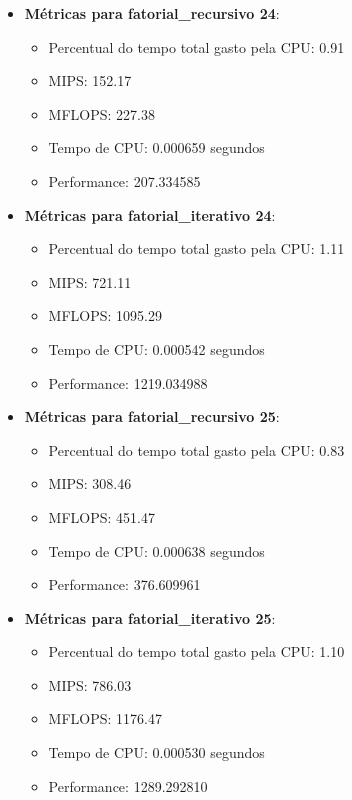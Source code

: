 \documentclass[12pt]{article}
\begin{document}
\begin{itemize}
    \item \textbf{Métricas para fatorial\_recursivo 24}:
    \begin{itemize}
        \item Percentual do tempo total gasto pela CPU: 0.91
        \item MIPS: 152.17
        \item MFLOPS: 227.38
        \item Tempo de CPU: 0.000659 segundos
        \item Performance: 207.334585
    \end{itemize}

    \item \textbf{Métricas para fatorial\_iterativo 24}:
    \begin{itemize}
        \item Percentual do tempo total gasto pela CPU: 1.11
        \item MIPS: 721.11
        \item MFLOPS: 1095.29
        \item Tempo de CPU: 0.000542 segundos
        \item Performance: 1219.034988
    \end{itemize}

    \item \textbf{Métricas para fatorial\_recursivo 25}:
    \begin{itemize}
        \item Percentual do tempo total gasto pela CPU: 0.83
        \item MIPS: 308.46
        \item MFLOPS: 451.47
        \item Tempo de CPU: 0.000638 segundos
        \item Performance: 376.609961
    \end{itemize}

    \item \textbf{Métricas para fatorial\_iterativo 25}:
    \begin{itemize}
        \item Percentual do tempo total gasto pela CPU: 1.10
        \item MIPS: 786.03
        \item MFLOPS: 1176.47
        \item Tempo de CPU: 0.000530 segundos
        \item Performance: 1289.292810
    \end{itemize}


\end{itemize}
\end{document}
